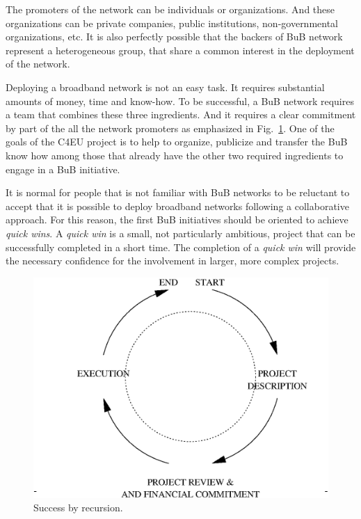 \documentclass[conference]{IEEEtran}
\begin{document}
The promoters of the network can be individuals or organizations.
And these organizations can be private companies, public institutions, non-governmental organizations, etc.  
It is also perfectly possible that the backers of BuB network represent a heterogeneous group, that share a common interest in the deployment of the network.

Deploying a broadband network is not an easy task.
It requires substantial amounts of money, time and know-how.
To be successful, a BuB network requires a team that combines these three ingredients.
And it requires a clear commitment by part of the all the network promoters as emphasized in Fig.~\ref{fig:success_wheel}.
One of the goals of the C4EU project is to help to organize, publicize and transfer the  BuB know how among those that already have the other two required ingredients to engage in a BuB initiative.

It is normal for people that is not familiar with BuB networks to be reluctant to accept that it is possible to deploy broadband networks following a collaborative approach.
For this reason, the first BuB initiatives should be oriented to achieve \emph{quick wins}.
A \emph{quick win} is a small, not particularly ambitious, project that can be successfully completed in a short time.
The completion of a \emph{quick win} will provide the necessary confidence for the involvement in larger, more complex projects.

\begin{figure}[!t]
\centering
\includegraphics[width=\linewidth]{success_wheel}
\caption{Success by recursion.}
\label{fig:success_wheel}
\end{figure}
\end{document}
